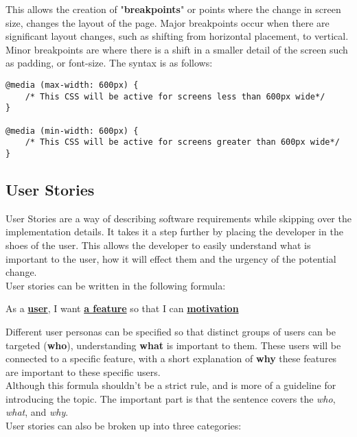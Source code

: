 \documentclass[portfolio.tex.tex]{subfiles}
\begin{document}
					This allows the creation of "\textbf{breakpoints}" or points where the change in screen size, changes the layout of the page. Major breakpoints occur when there are significant layout changes, such as shifting from horizontal placement, to vertical. Minor breakpoints are where there is a shift in a smaller detail of the screen such as padding, or font-size. The syntax is as follows: \\

					\begin{lstlisting}
@media (max-width: 600px) {
	/* This CSS will be active for screens less than 600px wide*/
}

@media (min-width: 600px) {
	/* This CSS will be active for screens greater than 600px wide*/
}
					\end{lstlisting}
					\autocite{google-responsive}

			\subsection{User Stories}
				User Stories are a way of describing software requirements while skipping over the implementation details. It takes it a step further by placing the developer in the shoes of the user. This allows the developer to easily understand what is important to the user, how it will effect them and the urgency of the potential change. \\

				User stories can be written in the following formula:

				\begin{center}
					As a \underline{\textbf{user}}, I want \underline{\textbf{a feature}} so that I can \underline{\textbf{motivation}}
				\end{center}


				Different user personas can be specified so that distinct groups of users can be targeted (\textbf{who}), understanding \textbf{what} is important to them. These users will be connected to a specific feature, with a short explanation of \textbf{why} these features are important to these specific users.\\

				Although this formula shouldn't be a strict rule, and is more of a guideline for introducing the topic. The important part is that the sentence covers the \textit{who}, \textit{what}, and \textit{why}.\\

				User stories can also be broken up into three categories:
\end{document}
